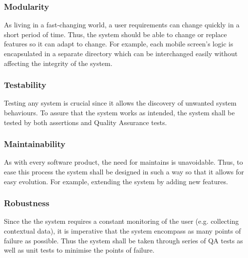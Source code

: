         \subsubsection{Modularity}
        As living in a fast-changing world, a user requirements can change quickly in a short period of time. Thus, the system should be able to change or replace features so it can adapt to change. For example, each mobile screen's logic is encapsulated in a separate directory which can be interchanged easily without affecting the integrity of the system.  
        
        \subsubsection{Testability}
        Testing any system is crucial since it allows the discovery of unwanted system behaviours. To assure that the system works as intended, the system shall be tested by both assertions and Quality Assurance tests. 
        
        \subsubsection{Maintainability}
        As with every software product, the need for maintains is unavoidable. Thus, to ease this process the system shall be designed in such a way so that it allows for easy evolution. For example, extending the system by adding new features.
        
        \subsubsection{Robustness}
        Since the the system requires a constant monitoring of the user (e.g. collecting contextual data), it is imperative that the system encompass as many points of failure as possible. Thus the system shall be taken through series of QA tests as well as unit tests to minimise the points of failure. 
    
    
    
